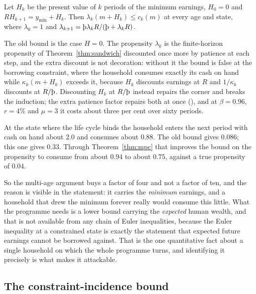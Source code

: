\begin{theorem}\label{thm:lower}
Let $H_k$ be the present value of $k$ periods of the minimum earnings, $H_0=0$ and
$RH_{k+1}=y_{\min}+H_k$. Then $\lambda_k(m+H_k)\le c_k(m)$ at every age and state, where
$\lambda_0=1$ and $\lambda_{k+1}=\Thorn\lambda_kR/(\Thorn+\lambda_kR)$.
\end{theorem}

The old bound is the case $H=0$. The propensity $\lambda_k$ is the finite-horizon propensity of
Theorem~\ref{thm:sandwich} discounted once more by patience at each step, and the extra discount is
not decoration: without it the bound is false at the borrowing constraint, where the household
consumes exactly its cash on hand while $\kappa_k(m+H_k)$ exceeds it, because $H_k$ discounts
earnings at $R$ and $1/\kappa_k$ discounts at $R/\Thorn$. Discounting $H_k$ at $R/\Thorn$ instead
repairs the corner and breaks the induction; the extra patience factor repairs both at once
(), and at $\beta=0.96$, $r=4\%$ and $\mu=3$ it costs about
three per cent over sixty periods.

At the state where the life cycle binds the household enters the next period with cash on hand
about $2.0$ and consumes about $0.88$. The old bound gives $0.086$; this one gives $0.33$. Through
Theorem~\ref{thm:mpc} that improves the bound on the propensity to consume from about $0.94$ to
about $0.75$, against a true propensity of $0.04$.

So the multi-age argument buys a factor of four and not a factor of ten, and the reason is visible
in the statement: it carries the \emph{minimum} earnings, and a household that drew the minimum
forever really would consume this little. What the programme needs is a lower bound carrying the
\emph{expected} human wealth, and that is not available from any chain of Euler inequalities,
because the Euler inequality at a constrained state is exactly the statement that expected future
earnings cannot be borrowed against. That is the one quantitative fact about a single household
on which the whole programme turns, and identifying it precisely is what makes it attackable.

\subsection{The constraint-incidence bound}

